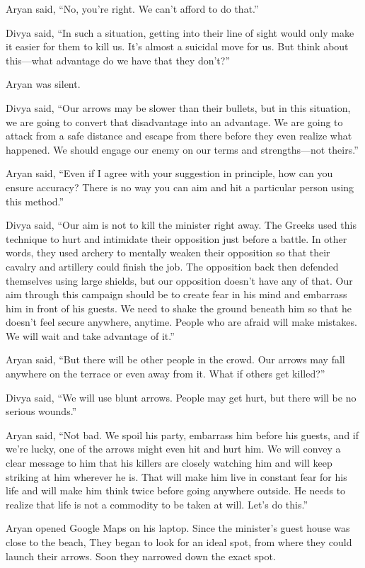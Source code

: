 Aryan said, “No, you're right. We can't afford to do that.”

Divya said, “In such a situation, getting into their line of sight would only
make it easier for them to kill us. It's almost a suicidal move for us. But
think about this—what advantage do we have that they don't?”

Aryan was silent.

Divya said, “Our arrows may be slower than their bullets, but in this situation,
we are going to convert that disadvantage into an advantage. We are going to
attack from a safe distance and escape from there before they even realize what
happened. We should engage our enemy on our terms and strengths—not theirs.”

Aryan said, “Even if I agree with your suggestion in principle, how can you ensure
accuracy? There is no way you can aim and hit a particular person using this
method.”

Divya said, “Our aim is not to kill the minister right away. The Greeks used
this technique to hurt and intimidate their opposition just before a battle. In
other words, they used archery to mentally weaken their opposition so that their
cavalry and artillery could finish the job. The opposition back then defended
themselves using large shields, but our opposition doesn't have any of that. Our
aim through this campaign should be to create fear in his mind and embarrass him
in front of his guests. We need to shake the ground beneath him so that he
doesn't feel secure anywhere, anytime. People who are afraid will make mistakes.
We will wait and take advantage of it.”

Aryan said, “But there will be other people in the crowd. Our arrows may fall
anywhere on the terrace or even away from it. What if others get killed?”

Divya said, “We will use blunt arrows. People may get hurt, but there will be no
serious wounds.”

Aryan said, “Not bad. We spoil his party, embarrass him before his guests, and
if we're lucky, one of the arrows might even hit and hurt him. We will convey a
clear message to him that his killers are closely watching him and will keep
striking at him wherever he is. That will make him live in constant fear for
his life and will make him think twice before going anywhere outside. He needs to
realize that life is not a commodity to be taken at will. Let's do this.”

Aryan opened Google Maps on his laptop. Since the minister's guest house was
close to the beach, They began to look for an ideal spot, from where they could
launch their arrows. Soon they narrowed down the exact spot.

